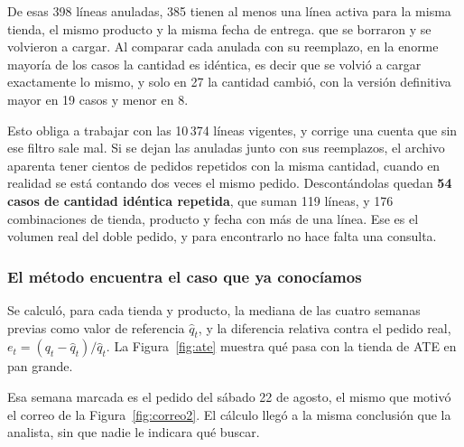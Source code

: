 De esas 398 líneas anuladas, 385 tienen al menos una línea activa para la misma tienda, el mismo producto y la misma fecha de entrega.  que se borraron y se volvieron a cargar. Al comparar cada anulada con su reemplazo, en la enorme mayoría de los casos la cantidad es idéntica, es decir que se volvió a cargar exactamente lo mismo, y solo en 27 la cantidad cambió, con la versión definitiva mayor en 19 casos y menor en 8.

Esto obliga a trabajar con las 10\,374 líneas vigentes, y corrige una cuenta que sin ese filtro sale mal. Si se dejan las anuladas junto con sus reemplazos, el archivo aparenta tener cientos de pedidos repetidos con la misma cantidad, cuando en realidad se está contando dos veces el mismo pedido. Descontándolas quedan \textbf{54 casos de cantidad idéntica repetida}, que suman 119 líneas, y 176 combinaciones de tienda, producto y fecha con más de una línea. Ese es el volumen real del doble pedido, y para encontrarlo no hace falta  una consulta.


\subsubsection{El método encuentra el caso que ya conocíamos}

Se calculó, para cada tienda y producto, la mediana de las cuatro semanas previas como valor de referencia $\hat q_t$, y la diferencia relativa contra el pedido real, $e_t = (q_t - \hat q_t)/\hat q_t$. La Figura~\ref{fig:ate} muestra qué pasa con la tienda de ATE en pan grande.

Esa semana marcada es el pedido del sábado 22 de agosto, el mismo que motivó el correo de la Figura~\ref{fig:correo2}. El cálculo llegó a la misma conclusión que la analista, sin que nadie le indicara qué buscar. 


